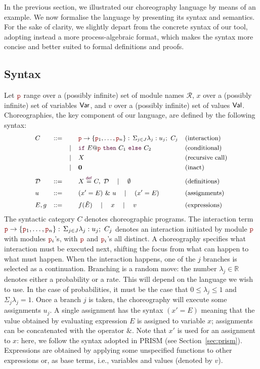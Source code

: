 In the previous section, we illustrated our choreography language by
means of an example. We now formalise the language by presenting its
syntax and semantics. For the sake of clarity, we slightly depart from
the concrete syntax of our tool, adopting instead a more
process-algebraic format, which makes the syntax more concise and
better suited to formal definitions and proofs.

\subsection{Syntax}\label{sub:syntax}
Let $\role p$ range over a (possibly infinite) set of module names
$\mathcal R$, $x$ over a (possibly infinite) set of variables $\mathsf{Var}$,
and $v$ over a (possibly infinite) set of values $\mathsf{Val}$.
Choreographies, the key component of our language, are defined by the
following syntax:
\begin{displaymath}\small
  \begin{array}{llllllllllll}
    C & ::= &      & \interact{\nr}{\nr_1,\ldots,\nr_n} & \text{(interaction)}\\[1mm]
      &     & \mid & \ifTE {E}{\nr}{C_1}{C_2} & \text{(conditional)}\\[1mm]
      &     & \mid & X     & \text{(recursive call)}\\[1mm]
      &     & \mid & \CEnd & \text{(inact)}
    \\[2mm]
    \defin \ & ::= & & X\stackrel{\textcolor{sh_keyword}{\mathsf{def}}}{=} C,\ \defin 
                     \quad \mid \quad \emptyset & \text{(definitions)}
    \\[2mm]
    u     & ::=  && (x' = E)\ \&\ u \quad\mid\quad    (x' = E) & \text{(assignments)}\\[2mm]
    E, g  & ::=  && f(\tilde E)\quad\mid\quad x\quad\mid\quad v & \text{(expressions)}
  \end{array}
\end{displaymath}
The syntactic category $C$ denotes choreographic programs. The
interaction term
$\interact{\nr}{\nr_1,\ldots,\nr_n}$ denotes an interaction initiated by module $\nr$ with
modules $\nr_i$'s, with $\nr$ and $\nr_i$'s all distinct. A
choreography specifies what interaction must be executed next,
shifting the focus from what can happen to what must happen. When the
interaction happens, one of the $j$ branches is selected as a
continuation. Branching is a random move: the number
$\lambda_j\in\mathbb R$ denotes either a probability or a rate. This
will depend on the language we wish to use. In the case of
probabilities, it must be the case that $0\leq\lambda_j\leq 1$ and
$\Sigma_j\lambda_j=1$. Once a branch $j$ is taken, the choreography
will execute some assignments $u_j$. A single assignment has the
syntax $(x' = E)$ meaning that the value obtained by evaluating
expression $E$ is assigned to variable $x$; assignments can be
concatenated with the operator $\&$.  Note that $x'$ is used for an
assignment to $x$: here, we follow the syntax adopted in PRISM
(see Section~\ref{sec:prism}). Expressions are obtained by applying some
unspecified functions to other expressions or, as base terms, i.e.,
variables and values (denoted by $v$).

